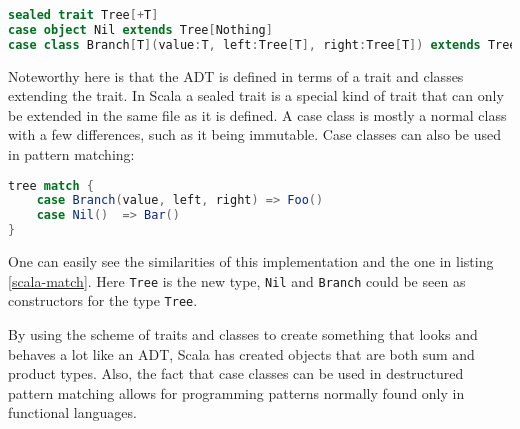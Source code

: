 \documentclass[10pt]{report}
\def\code#1{\texttt{#1}} %
\begin{document}
\begin{lstlisting}[language=Scala,caption={ADT definition in Scala},label={lst:e4c_syntax}]
sealed trait Tree[+T]
case object Nil extends Tree[Nothing]
case class Branch[T](value:T, left:Tree[T], right:Tree[T]) extends Tree[T]
\end{lstlisting}
\par{Noteworthy here is that the ADT is defined in terms of a trait and classes extending the trait. In Scala a sealed trait is a special kind of trait that can only be extended in the same file as it is defined. A case class is mostly a normal class with a few differences, such as it being immutable\cite{ScalaCase}. Case classes can also be used in pattern matching:}
\begin{lstlisting}[language=Scala,caption={Pattern matching on an ADT in Scala},label=scala-match]
tree match {
    case Branch(value, left, right) => Foo()
    case Nil()  => Bar()
}
\end{lstlisting}
\par{One can easily see the similarities of this implementation and the one in listing \ref{scala-match}. Here \code{Tree} is the new type, \code{Nil} and \code{Branch} could be seen as constructors for the type \code{Tree}.}
\par{By using the scheme of traits and classes to create something that looks and behaves a lot like an ADT, Scala has created objects that are both sum and product types. Also, the fact that case classes can be used in destructured pattern matching allows for programming patterns normally found only in functional languages.}
\end{document}
